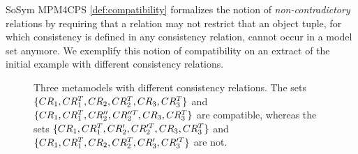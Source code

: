 \begin{copiedFrom}{SoSym MPM4CPS}
\autoref{def:compatibility} formalizes the notion of \emph{non-contradictory} relations by requiring that a relation may not restrict that an object tuple, for which consistency is defined in any consistency relation, cannot occur in a model set anymore.
We exemplify this notion of compatibility on an extract of the initial example with different consistency relations.


\begin{figure}
    \centering
    
    \caption{Three metamodels with different consistency relations. The sets $\{ CR_{1}, CR^T_{1},CR_{2}, CR^T_{2}, CR_{3}, CR^T_{3} \}$ and $\{ CR_{1}, CR^T_{1}, CR''_{2}, CR''^T_{2}, CR_{3}, CR^T_{3} \}$ are compatible, whereas the sets $\{ CR_{1}, CR^T_{1}, CR'_{2}, CR'^T_{2}, CR_{3}, CR^T_{3} \}$ and $\{ CR_{1}, CR^T_{1}, CR_{2}, CR^T_{2}, CR'_{3}, CR'^T_{3} \}$ are not.}
    \label{fig:correctness:formal:incompatibility_example}
\end{figure}


\end{copiedFrom}
